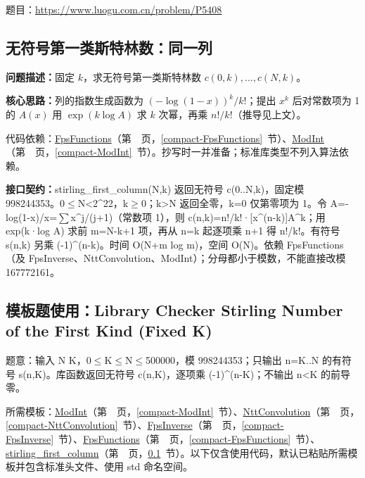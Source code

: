 题目：\url{https://www.luogu.com.cn/problem/P5408}



\Needspace{494pt}

\subsection{无符号第一类斯特林数：同一列}\label{compact-stirling_first_column}

\noindent\textbf{问题描述：}\allowbreak 固定 $k$，求无符号第一类斯特林数 $c(0,k),\dots,c(N,k)$。

\textbf{核心思路：}\allowbreak 列的指数生成函数为 $(-\log(1-x))^k/k!$；提出 $x^k$ 后对常数项为 1 的 $A(x)$ 用 $\exp(k\log A)$ 求 $k$ 次幂，再乘 $n!/k!$（推导见上文）。

代码依赖：\hyperref[compact-FpsFunctions]{FpsFunctions}（第~\pageref{compact-FpsFunctions}~页，\ref{compact-FpsFunctions}~节）、\hyperref[compact-ModInt]{ModInt}（第~\pageref{compact-ModInt}~页，\ref{compact-ModInt}~节）。抄写时一并准备；标准库类型不列入算法依赖。

{\sloppy{}\noindent\textbf{接口契约：}stirling\_first\_column(N,k) 返回无符号 c(0..N,k)，固定模 998244353。0$\le$N<2\textasciicircum{}22，k$\ge$0；k>N 返回全零，k=0 仅第零项为 1。令 A=-log(1-x)/x=$\sum$x\textasciicircum{}j/(j+1)（常数项 1），则 c(n,k)=n!/k!·[x\textasciicircum{}(n-k)]A\textasciicircum{}k；用 exp(k·log A) 求前 m=N-k+1 项，再从 n=k 起逐项乘 n+1 得 n!/k!。有符号 s(n,k) 另乘 (-1)\textasciicircum{}(n-k)。时间 O(N+m log m)，空间 O(N)。依赖 FpsFunctions（及 FpsInverse、NttConvolution、ModInt）；分母都小于模数，不能直接改模 167772161。\par}



\Needspace{338pt}

\subsection*{模板题使用：Library Checker Stirling Number of the First Kind (Fixed K)}

\label{usage-example-433}

题意：输入 N K，0$\le$K$\le$N$\le$500000，模 998244353；只输出 n=K..N 的有符号 s(n,K)。库函数返回无符号 c(n,K)，逐项乘 (-1)\textasciicircum{}(n-K)；不输出 n<K 的前导零。

所需模板：\hyperref[compact-ModInt]{ModInt}（第~\pageref{compact-ModInt}~页，\ref{compact-ModInt}~节）、\hyperref[compact-NttConvolution]{NttConvolution}（第~\pageref{compact-NttConvolution}~页，\ref{compact-NttConvolution}~节）、\hyperref[compact-FpsInverse]{FpsInverse}（第~\pageref{compact-FpsInverse}~页，\ref{compact-FpsInverse}~节）、\hyperref[compact-FpsFunctions]{FpsFunctions}（第~\pageref{compact-FpsFunctions}~页，\ref{compact-FpsFunctions}~节）、\hyperref[compact-stirling_first_column]{stirling\_\allowbreak{}first\_\allowbreak{}column}（第~\pageref{compact-stirling_first_column}~页，\ref{compact-stirling_first_column}~节）。以下仅含使用代码，默认已粘贴所需模板并包含标准头文件、使用 std 命名空间。

